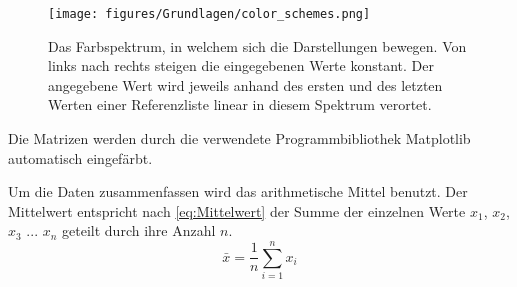 \begin{figure}
    \centering
    \texttt{[image: figures/Grundlagen/color\_schemes.png]}
    \caption{Das Farbspektrum, in welchem sich die Darstellungen bewegen. Von links nach rechts steigen die eingegebenen Werte konstant. Der angegebene Wert wird jeweils anhand des ersten und des letzten Werten einer Referenzliste linear in diesem Spektrum verortet.}
    \label{fig:color_schemes}
\end{figure}

Die Matrizen werden durch die verwendete Programmbibliothek \glqq{}Matplotlib\grqq{} automatisch eingefärbt.


Um die Daten zusammenfassen wird das arithmetische Mittel benutzt. Der Mittelwert entspricht nach \autoref{eq:Mittelwert} der Summe der einzelnen Werte $x_1$, $x_2$, $x_3$ ... $x_n$ geteilt durch ihre Anzahl $n$.
\begin{equation}\label{eq:Mittelwert}
    \bar x = \frac{1}{n}\sum_{i=1}^n x_i
\end{equation}